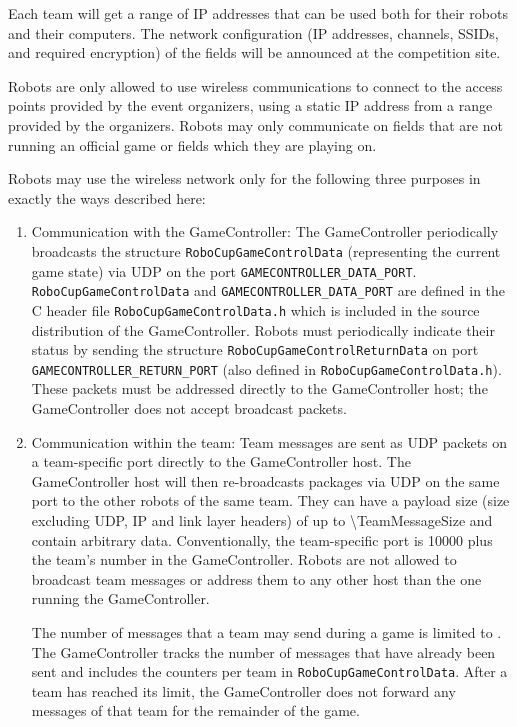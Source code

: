 Each team will get a range of IP addresses that can be used both for their robots and their computers. The network configuration (\eg IP addresses, channels, SSIDs, and required encryption) of the fields will be announced at the competition site.

Robots are only allowed to use wireless communications to connect to the access points provided by the event organizers, using a static IP address from a range provided by the organizers. Robots may only communicate on fields that are not running an official game or fields which they are playing on.

Robots may use the wireless network only for the following three purposes in exactly the ways described here:
\begin{enumerate}
  \item Communication with the GameController:
  The GameController periodically broadcasts the structure \texttt{RoboCupGameControlData} (representing the current game state) via UDP on the port \texttt{GAMECONTROLLER\_DATA\_PORT}. \texttt{RoboCupGameControlData} and \texttt{GAMECONTROLLER\_DATA\_PORT} are defined in the C header file \texttt{RoboCupGameControlData.h} which is included in the source distribution of the GameController. Robots must periodically indicate their status by sending the structure \texttt{RoboCupGameControlReturnData} on port \texttt{GAMECONTROLLER\_RETURN\_PORT} (also defined in \texttt{RoboCupGameControlData.h}). These packets must be addressed directly to the GameController host; the GameController does not accept broadcast packets.

  \item Communication within the team:
  Team messages are sent as UDP packets on a team-specific port directly to the GameController host. The GameController host will then re-broadcasts packages via UDP on the same port to the other robots of the same team. They can have a payload size (\ie size excluding UDP, IP and link layer headers) of up to \qty{\TeamMessageSize}{\byte} and contain arbitrary data. Conventionally, the team-specific port is 10000 plus the team's number in the GameController. Robots are not allowed to broadcast team messages or address them to any other host than the one running the GameController.

  The number of messages that a team may send during a game is limited to \TeamMessageLimit. The GameController tracks the number of messages that have already been sent and includes the counters per team in \texttt{RoboCupGameControlData}. After a team has reached its limit, the GameController does not forward any messages of that team for the remainder of the game.


\end{enumerate}

